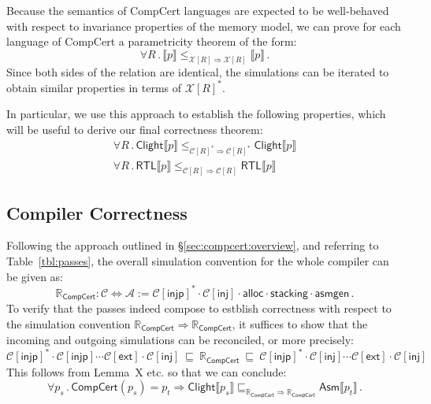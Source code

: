 \documentclass[acmsmall,timestamp,review,anonymous]{acmart}
\newcommand{\kw}[1]{\ensuremath{ \mathsf{#1} }}
\begin{document}
Because the semantics of CompCert languages
are expected to be well-behaved with respect to
invariance properties of the memory model,
we can prove for each language of CompCert
a parametricity theorem of the form:
\[
    \forall R \,.\,
      \llbracket p \rrbracket
        \le_{\mathcal{X}[R] \Rightarrow \mathcal{X}[R]}
      \llbracket p \rrbracket \,.
\]
Since both sides of the relation are identical,
the simulations can be iterated
to obtain similar properties in terms of $\mathcal{X}[R]^*$.

In particular,
we use this approach to establish the following properties,
which will be useful to derive our final correctness theorem:
\begin{gather}
    \forall R \,.\,
      \kw{Clight} \llbracket p \rrbracket
        \le_{\mathcal{C}[R]^* \Rightarrow \mathcal{C}[R]^*}
      \kw{Clight} \llbracket p \rrbracket
      \label{eqn:clight}
      \\
    \forall R \,.\,
      \kw{RTL} \llbracket p \rrbracket
        \le_{\mathcal{C}[R] \Rightarrow \mathcal{C}[R]}
      \kw{RTL} \llbracket p \rrbracket
      \label{eqn:rtl}
\end{gather}


\subsection{Compiler Correctness} %

Following the approach outlined in \S\ref{sec:compcert:overview},
and referring to Table~\ref{tbl:passes},
the overall simulation convention for the whole compiler
can be given as:
\[
  \mathbb{R}_\kw{CompCert} : \mathcal{C} \Leftrightarrow \mathcal{A} :=
    \mathcal{C}[\kw{injp}]^* \cdot
    \mathcal{C}[\kw{inj}] \cdot
    \kw{alloc} \cdot
    \kw{stacking} \cdot
    \kw{asmgen} \,.
\]
To verify that the passes indeed compose to
estblish correctness with respect to the simulation convention
$\mathbb{R}_\kw{CompCert} \Rightarrow \mathbb{R}_\kw{CompCert}$,
it suffices to show that
the incoming and outgoing simulations can be reconciled,
or more precisely:
\[
    \mathcal{C}[\kw{injp}]^* \cdot
    \mathcal{C}[\kw{injp}] \cdots
    \mathcal{C}[\kw{ext}] \cdot
    \mathcal{C}[\kw{inj}]
    \: \sqsubseteq \:
    \mathbb{R}_\kw{CompCert}
    \: \sqsubseteq \:
    \mathcal{C}[\kw{injp}]^* \cdot
    \mathcal{C}[\kw{inj}] \cdots
    \mathcal{C}[\kw{ext}] \cdot
    \mathcal{C}[\kw{inj}] 
\]
This follows from Lemma~X etc.
so that we can conclude:
\[
    \forall p_s \,.\,
      \kw{CompCert}(p_s) = p_t \Rightarrow
      \kw{Clight} \llbracket p_s \rrbracket
      \sqsubseteq_{\mathbb{R}_\kw{CompCert} \Rightarrow
                   \mathbb{R}_\kw{CompCert}}
      \kw{Asm} \llbracket p_t \rrbracket \,.
\]
\end{document}
